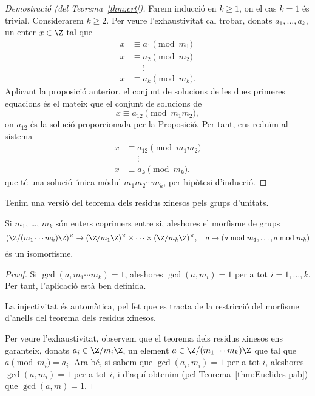   \begin{proof}[Demostració (del Teorema~\ref{thm:crt})]
   Farem inducció en $k\geq 1$, on el cas $k=1$ és trivial. Considerarem $k\geq 2$. Per veure l'exhaustivitat cal trobar, donats $a_1,\ldots,a_k$, un enter $x\in\Z$ tal que
   \begin{align*}
   x&\equiv a_1\pmod{m_1}\\
   x&\equiv a_2\pmod{m_2}\\
   \phantom{x}&\phantom{\equiv}\vdots\\
   x&\equiv a_k\pmod{m_k}.
   \end{align*}
   Aplicant la proposició anterior,
   el conjunt de solucions de les dues primeres equacions és el mateix que el conjunt de solucions de
   \[
   x\equiv a_{12}\pmod{m_1m_2},
   \]
   on $a_{12}$ és la solució proporcionada per la Proposició. Per tant, ens reduïm al sistema
    \begin{align*}
   x&\equiv a_{12}\pmod{m_1m_2}\\
   \phantom{x}&\phantom{\equiv}\vdots\\
   x&\equiv a_k\pmod{m_k}.
   \end{align*}
  que té una solució única mòdul $m_1m_2\cdots m_k$, per hipòtesi d'inducció.
  \end{proof}
 
 Tenim una versió del teorema dels residus xinesos pels grups d'unitats.
 \begin{lemma}
 Si $m_1$, \ldots, $m_k$ són enters coprimers entre si, aleshores el morfisme de grups
  \[
  (\Z/(m_1\cdots m_k)\Z)^\times\to(\Z/m_1\Z)^{\times} \times\cdots\times (\Z/m_k\Z)^{\times},\quad a\mapsto (a\bmod m_1,\ldots, a\bmod m_k)
  \]
  és un isomorfisme.
 \end{lemma}
 \begin{proof}
  Si $\gcd(a,m_1\cdots m_k) = 1$, aleshores $\gcd(a,m_i)=1$ per a tot $i=1,\ldots,k$. Per tant, l'aplicació està ben definida.
  
  La injectivitat és automàtica, pel fet que es tracta de la restricció del morfisme d'anells del teorema dels residus xinesos.
  
  Per veure l'exhaustivitat, observem que el teorema dels residus xinesos ens garanteix, donats $a_i \in \Z/m_i\Z$, un element $a\in\Z/(m_1\cdots m_k)\Z$ que tal que $a\pmod m_i = a_i$. Ara bé, si sabem que $\gcd(a_i,m_i)=1$ per a tot $i$, aleshores $\gcd(a,m_i)=1$ per a tot $i$, i d'aquí obtenim (pel Teorema~\ref{thm:Euclides-pab}) que $\gcd(a,m)=1$.
 \end{proof}
 
